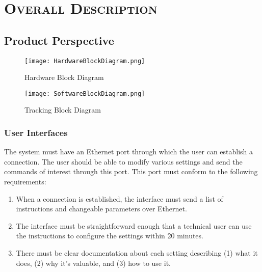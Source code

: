 \documentclass[ProductRequirements.tex]{subfiles}
\begin{document}
\bigskip

\section{\textsc{\Large Overall Description}}
	\subsection{Product Perspective}
	\begin{figure}[H]
		\centering
		\texttt{[image: HardwareBlockDiagram.png]}
		\caption{Hardware Block Diagram \label{fig:HardwareBlockDiagram}}
	\end{figure}
	\begin{figure}[H]
		\centering
		\texttt{[image: SoftwareBlockDiagram.png]}
		\caption{Tracking Block Diagram \label{fig:SoftwareBlockDiagram}}
	\end{figure}
			
		\subsubsection{User Interfaces}
			The system must have an Ethernet port through which the user can establish a connection. The user should be able to modify various settings and send the commands of interest through this port. This port must conform to the following requirements:
			\begin{enumerate}
				\item When a connection is established, the interface must send a list of instructions and changeable parameters over Ethernet.
				\item The interface must be straightforward enough that a technical user can use the instructions to configure the settings within 20 minutes.
				\item There must be clear documentation about each setting describing (1) what it does, (2) why it's valuable, and (3) how to use it.
			\end{enumerate}	
			
\end{document}
